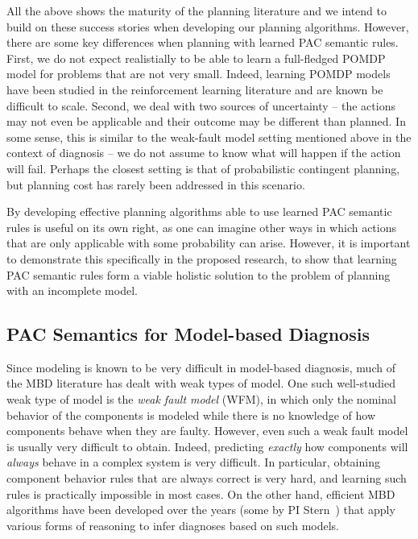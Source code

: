 \documentclass[12pt]{article}
\newcommand{\note}[1]{\textbf{\textit{#1}}}
\begin{document}
All the above shows the maturity of the planning literature 
and we intend to build on these success stories when developing our  planning algorithms. However, there are some key differences 
when planning with learned PAC semantic rules. First, we do not expect realistially to be able to learn a full-fledged POMDP model for problems that are not very small. Indeed, learning POMDP models have been studied in the reinforcement learning literature and are known be difficult to scale. 
Second, we deal with two sources of uncertainty -- the actions may not even be applicable and their outcome may be different than planned. In some sense, this is similar to the weak-fault model setting mentioned above in the context of diagnosis -- we do not assume to know what will happen if the action will fail. Perhaps the closest setting is that of probabilistic contingent planning, but planning cost has rarely been addressed in this scenario. 


By developing effective planning algorithms able to use learned PAC semantic rules is useful on its own right, as one can imagine other ways in which actions that are only applicable with some probability can arise. However, 
it is important to demonstrate this specifically in the proposed research, to show that learning PAC semantic rules form a viable holistic solution to the problem of planning with an incomplete model. 










\subsection{PAC Semantics for Model-based Diagnosis}


Since modeling is known to be very difficult in model-based diagnosis, much of the MBD literature has dealt with weak types of model. One such well-studied weak type of model is the {\em weak fault model} (WFM), in which only the nominal behavior of the components is modeled while there is no knowledge of how components behave when they are faulty. However, even such a weak fault model is usually very difficult to obtain. Indeed, predicting {\em exactly} how components will {\em always} behave in a complex system is very difficult. In particular, obtaining component behavior rules that are always correct is very hard, and learning such rules is practically impossible in most cases. 
On the other hand, efficient MBD algorithms have been developed over the years (some by PI Stern~\cite{metodi2014novel,stern2012exploring,stern2014hierarchical,elmishali2016dataAugmented,lazebnik2016solving}) that apply various forms of reasoning to infer diagnoses based on such models. 
\end{document}

